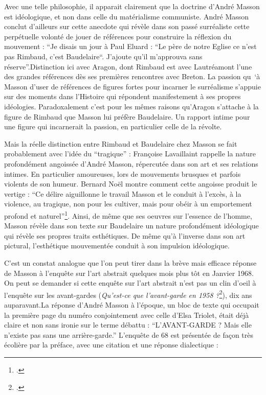 
	Avec une telle philosophie, il apparait clairement que la doctrine d’André Masson est idéologique, et non dans celle du matérialisme communiste. André Masson conclut d’ailleurs sur cette anecdote qui révèle dans son passé surréaliste cette perpétuelle volonté de jouer de références pour construire la réflexion du mouvement : \enquote{Je disais un jour à Paul Eluard : “Le père de notre Eglise ce n’est pas Rimbaud, c’est Baudelaire“. J’ajoute qu’il m’approuva sans réserve}.Distinction ici avec Aragon, dont Rimbaud est avec Lautréamont l’une des grandes références dès ses premières rencontres avec Breton. La passion qu ‘à Masson d’user de références de figures fortes pour incarner le surréalisme s’appuie sur des moments dans l’Histoire qui répondent manifestement à ses propres idéologies. Paradoxalement c’est pour les mêmes raisons qu’Aragon s’attache à la figure de Rimbaud que Masson lui préfère Baudelaire. Un rapport intime pour une figure qui incarnerait la passion, en particulier celle de la révolte. 

	Mais la réelle distinction entre Rimbaud et Baudelaire chez Masson se fait probablement avec l’idée du \enquote{tragique} : Françoise Lavaillaint rappelle la nature profondément angoissée d’André Masson, répercutée dans son art et ses relations intimes. En particulier amoureuses, lors de mouvements brusques et parfois violents de son humeur. Bernard Noël montre comment cette angoisse produit le vertige : \enquote{Ce délire aiguillonne le travail Masson et le conduit à l’excès, à la violence, au tragique, non pour les cultiver, mais pour obéir à un emportement profond et naturel}\footcite[p83]{noel}.  Ainsi, de même que ses oeuvres sur l’essence de l’homme, Masson révèle dans son texte sur Baudelaire un nature profondément idéologique qui révèle ses propres traits esthétiques. De même qu’à l’inverse dans son art pictural, l’esthétique mouvementée conduit à son impulsion idéologique. 

C’est un constat analogue que l’on peut tirer dans la brève mais efficace réponse de Masson à l’enquête sur l’art abstrait quelques mois plus tôt en Janvier 1968. On peut se demander si cette enquête sur l’art abstrait n’est pas un clin d’oeil à l’enquête sur les avant-gardes (\emph{Qu’est-ce que l’avant-garde en 1958 ?}\footcite{avantgarde}), dix ans auparavant.La réponse d’André Masson à l’époque, un bloc de texte qui occupait la première page du numéro conjointement avec celle d’Elsa Triolet, était déjà claire et non sans ironie sur le terme débattu : \enquote{L’AVANT-GARDE ? Mais elle n’existe pas sans une arrière-garde.} L’enquête de 68 est présentée de façon très écolière par la préface, avec une citation et une réponse dialectique : 

